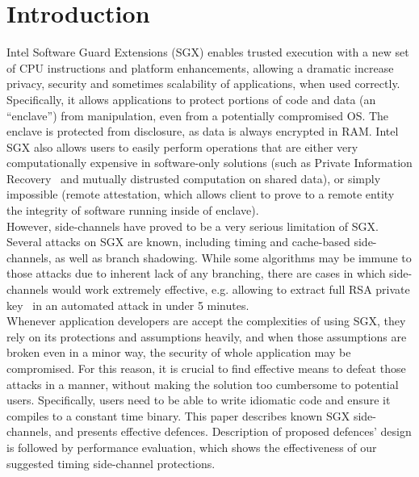 \documentclass[sigplan, review]{acmart}
\begin{document}
\section{Introduction}
Intel Software Guard Extensions (SGX) enables trusted execution with a new set of CPU instructions and platform enhancements, allowing a dramatic increase privacy, security and sometimes scalability of applications, when used correctly. Specifically, it allows applications to protect portions of code and data (an “enclave”) from manipulation, even from a potentially compromised OS. The enclave is protected from disclosure, as data is always encrypted in RAM. Intel SGX also allows users to easily perform operations that are either very computationally expensive in software-only solutions (such as Private Information Recovery~\cite{signalprivaterecovery} and mutually distrusted computation on shared data), or simply impossible (remote attestation, which allows client to prove to a remote entity the integrity of software running inside of enclave).\\
However, side-channels have proved to be a very serious limitation of SGX. Several attacks on SGX are known, including timing and cache-based side-channels, as well as branch shadowing. While some algorithms may be immune to those attacks due to inherent lack of any branching, there are cases in which side-channels would work extremely effective, e.g. allowing to extract full RSA private key~\cite{schwarz2017malware} in an automated attack in under 5 minutes.\\
Whenever application developers are accept the complexities of using SGX, they rely on its protections and assumptions heavily, and when those assumptions are broken even in a minor way, the security of whole application may be compromised. For this reason, it is crucial to find effective means to defeat those attacks in a manner, without making the solution too cumbersome to potential users. Specifically, users need to be able to write idiomatic code and ensure it compiles to a constant time binary.
This paper describes known SGX side-channels, and presents effective defences. Description of proposed defences’ design is followed by performance evaluation, which shows the effectiveness of our suggested timing side-channel protections.
\end{document}
